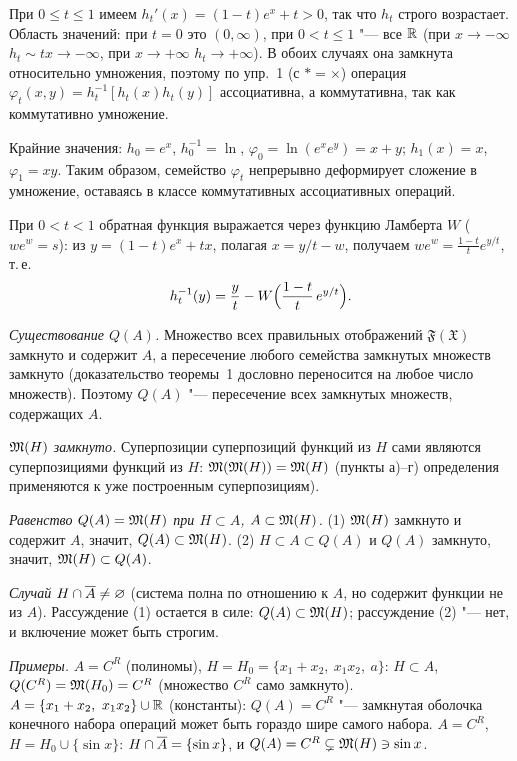 \begin{solution}[3 (\S\,4)]
При $0\le t\le1$ имеем $h_t'(x)=(1-t)e^x+t>0$, так что $h_t$ строго
возрастает. Область значений: при $t=0$ это $(0,\infty)$, при $0<t\le1$
"--- все $\mathbb R$ (при $x\to-\infty$ $h_t\sim tx\to-\infty$, при $x\to+\infty$
$h_t\to+\infty$). В обоих случаях она замкнута относительно умножения,
поэтому по упр.~1 (с $*=\times$) операция
$\varphi_t(x,y)=h_t^{-1}[h_t(x)h_t(y)]$ ассоциативна, а коммутативна,
так как коммутативно умножение.

Крайние значения: $h_0=e^x$, $h_0^{-1}=\ln$,
$\varphi_0=\ln(e^xe^y)=x+y$; $h_1(x)=x$, $\varphi_1=xy$. Таким образом,
семейство $\varphi_t$ непрерывно деформирует сложение в умножение,
оставаясь в классе коммутативных ассоциативных операций.

При $0<t<1$ обратная функция выражается через функцию Ламберта $W$
($we^w=s$): из $y=(1-t)e^x+tx$, полагая $x=y/t-w$, получаем
$we^w=\frac{1-t}{t}e^{y/t}$, т.\,е.
\[
h_t^{-1}(y)=\frac yt-W\Bigl(\frac{1-t}{t}\,e^{y/t}\Bigr).
\]
\end{solution}

\begin{solution}[4 (\S\,4)]
\emph{Существование $Q(A)$.} Множество всех правильных отображений
$\mathfrak F(\mathfrak X)$ замкнуто и содержит $A$, а пересечение любого
семейства замкнутых множеств замкнуто (доказательство теоремы~1 дословно
переносится на любое число множеств). Поэтому $Q(A)$ "--- пересечение всех
замкнутых множеств, содержащих $A$.

\emph{$\mathfrak M(H)$ замкнуто.} Суперпозиции суперпозиций функций из $H$ сами
являются суперпозициями функций из $H$: $\mathfrak M(\mathfrak M(H))=\mathfrak M(H)$ (пункты
а)--г) определения применяются к уже построенным суперпозициям).

\emph{Равенство $Q(A)=\mathfrak M(H)$ при $H\subset A$, $A\subset\mathfrak M(H)$.}
(1) $\mathfrak M(H)$ замкнуто и содержит $A$, значит, $Q(A)\subset\mathfrak M(H)$.
(2) $H\subset A\subset Q(A)$ и $Q(A)$ замкнуто, значит,
$\mathfrak M(H)\subset Q(A)$.

\emph{Случай $H\cap\overline{A}\ne\varnothing$} (система полна по отношению к $A$,
но содержит функции не из $A$). Рассуждение (1) остается в силе:
$Q(A)\subset\mathfrak M(H)$; рассуждение (2) "--- нет, и включение может быть
строгим.

\emph{Примеры.} $A=C^R$ (полиномы), $H=H_0=\{x_1+x_2,\ x_1x_2,\ a\}$:
$H\subset A$, $Q(C^R)=\mathfrak M(H_0)=C^R$ (множество $C^R$ само замкнуто).
$A=\{x_1+x_2,\ x_1x_2\}\cup\R$ (константы): $Q(A)=C^R$ "--- замкнутая
оболочка конечного набора операций может быть гораздо шире самого набора.
$A=C^R$, $H=H_0\cup\{\sin x\}$: $H\cap\overline{A}=\{\sin x\}$, и
$Q(A)=C^R\subsetneq\mathfrak M(H)\ni\sin x$.
\end{solution}


